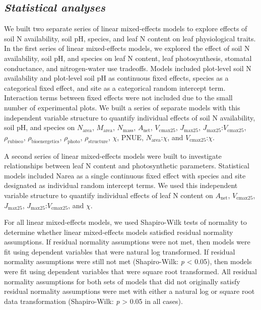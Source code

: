 \subsection{\textit{Statistical analyses}}
We built two separate series of linear mixed-effects models to explore effects of soil N availability, soil pH, species, and leaf N content on leaf physiological traits. In the first series of linear mixed-effects models, we explored the effect of soil N availability, soil pH, and species on leaf N content, leaf photosynthesis, stomatal conductance, and nitrogen-water use tradeoffs. Models included plot-level soil N availability and plot-level soil pH as continuous fixed effects, species as a categorical fixed effect, and site as a categorical random intercept term. Interaction terms between fixed effects were not included due to the small number of experimental plots. We built a series of separate models with this independent variable structure to quantify individual effects of soil N availability, soil pH, and species on $N_\mathrm{area}$, $M_\mathrm{area}$, $N_\mathrm{mass}$, $A_\mathrm{net}$, $V_\mathrm{cmax25}$, $J_\mathrm{max25}$, $J_\mathrm{max25}$:$V_\mathrm{cmax25}$, $\rho_\mathrm{rubisco}$, $\rho_\mathrm{bioenergetics}$, $\rho_\mathrm{photo}$, $\rho_\mathrm{structure}$, $\chi$, PNUE, $N_{\mathrm{area}}$:$\chi$, and $V_{\mathrm{cmax25}}$:$\chi$.

A second series of linear mixed-effects models were built to investigate relationships between leaf N content and photosynthetic parameters. Statistical models included Narea as a single continuous fixed effect with species and site designated as individual random intercept terms. We used this independent variable structure to quantify individual effects of leaf N content on $A_\mathrm{net}$, $V_\mathrm{cmax25}$, $J_\mathrm{max25}$, $J_\mathrm{max25}$:$V_\mathrm{cmax25}$, and $\chi$.

For all linear mixed-effects models, we used Shapiro-Wilk tests of normality to determine whether linear mixed-effects models satisfied residual normality assumptions. If residual normality assumptions were not met, then models were fit using dependent variables that were natural log transformed. If residual normality assumptions were still not met (Shapiro-Wilk: \textit{p} < 0.05), then models were fit using dependent variables that were square root transformed. All residual normality assumptions for both sets of models that did not originally satisfy residual normality assumptions were met with either a natural log or square root data transformation (Shapiro-Wilk: \textit{p} > 0.05 in all cases).


